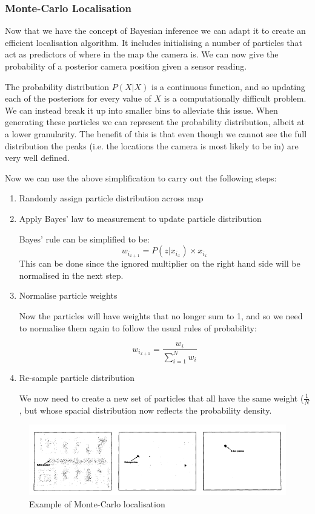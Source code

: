 \subsubsection{Monte-Carlo Localisation}

Now that we have the concept of Bayesian inference we can adapt it to create an efficient localisation algorithm. It includes initialising a number of particles that act as predictors of where in the map the camera is. We can now give the probability of a posterior camera position given a sensor reading.

The probability distribution $ P(X|X) $ is a continuous function, and so updating each of the posteriors for every value of $ X $ is a computationally difficult problem. We can instead break it up into smaller bins to alleviate this issue. When generating these particles we can represent the probability distribution, albeit at a lower granularity. The benefit of this is that even though we cannot see the full distribution the peaks (i.e. the locations the camera is most likely to be in) are very well defined.

Now we can use the above simplification to carry out the following steps:

\begin{enumerate}
      \item Randomly assign particle distribution across map
      \item Apply Bayes' law to measurement to update particle distribution

            Bayes' rule can be simplified to be:
            $$ w_{i_{x+1}} = P(z|x_{i_x}) \times x_{i_x} $$
            This can be done since the ignored multiplier on the right hand side will be normalised in the next step.
      \item Normalise particle weights

            Now the particles will have weights that no longer sum to 1, and so we need to normalise them again to follow the usual rules of probability:

            $$ w_{i_{x+1}} = \frac{w_i}{\sum^N_{i=1}w_i} $$
      \item Re-sample particle distribution

            We now need to create a new set of particles that all have the same weight ($ \frac{1}{N} $, but whose spacial distribution now reflects the probability density.
\end{enumerate}

\begin{figure}[htb]
      \centering
      \includegraphics[width=\textwidth]{background/images/monte_carlo.png}
      \caption{Example of Monte-Carlo localisation\cite{MonteCarloLocalisation}}
      \label{fig:monte_carlo}
\end{figure}

